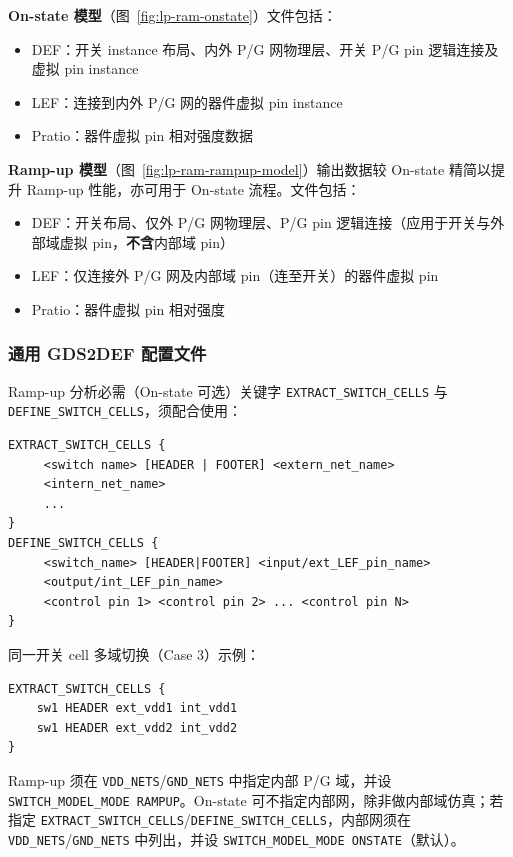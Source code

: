\textbf{On-state 模型}（图~\ref{fig:lp-ram-onstate}）文件包括：
\begin{itemize}
  \item DEF：开关 instance 布局、内外 P/G 网物理层、开关 P/G pin 逻辑连接及虚拟 pin instance
  \item LEF：连接到内外 P/G 网的器件虚拟 pin instance
  \item Pratio：器件虚拟 pin 相对强度数据
\end{itemize}


\textbf{Ramp-up 模型}（图~\ref{fig:lp-ram-rampup-model}）输出数据较 On-state 精简以提升 Ramp-up 性能，亦可用于 On-state 流程。文件包括：
\begin{itemize}
  \item DEF：开关布局、仅外 P/G 网物理层、P/G pin 逻辑连接（应用于开关与外部域虚拟 pin，\textbf{不含}内部域 pin）
  \item LEF：仅连接外 P/G 网及内部域 pin（连至开关）的器件虚拟 pin
  \item Pratio：器件虚拟 pin 相对强度
\end{itemize}


\subsubsection{通用 GDS2DEF 配置文件}
Ramp-up 分析必需（On-state 可选）关键字 \texttt{EXTRACT\_SWITCH\_CELLS} 与 \texttt{DEFINE\_SWITCH\_CELLS}，须配合使用：
\begin{lstlisting}
EXTRACT_SWITCH_CELLS {
     <switch name> [HEADER | FOOTER] <extern_net_name>
     <intern_net_name>
     ...
}
DEFINE_SWITCH_CELLS {
     <switch_name> [HEADER|FOOTER] <input/ext_LEF_pin_name>
     <output/int_LEF_pin_name>
     <control pin 1> <control pin 2> ... <control pin N>
}
\end{lstlisting}

同一开关 cell 多域切换（Case 3）示例：
\begin{lstlisting}
EXTRACT_SWITCH_CELLS {
    sw1 HEADER ext_vdd1 int_vdd1
    sw1 HEADER ext_vdd2 int_vdd2
}
\end{lstlisting}

Ramp-up 须在 \texttt{VDD\_NETS}/\texttt{GND\_NETS} 中指定内部 P/G 域，并设 \texttt{SWITCH\_MODEL\_MODE RAMPUP}。On-state 可不指定内部网，除非做内部域仿真；若指定 \texttt{EXTRACT\_SWITCH\_CELLS}/\texttt{DEFINE\_SWITCH\_CELLS}，内部网须在 \texttt{VDD\_NETS}/\texttt{GND\_NETS} 中列出，并设 \texttt{SWITCH\_MODEL\_MODE ONSTATE}（默认）。

